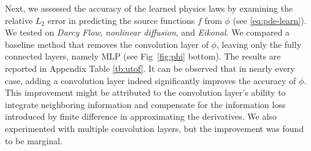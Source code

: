  
Next, we assessed the accuracy of the learned physics laws by examining the relative \(L_2\) error in predicting the source functions \(f\) from \(\phi\) (see \eqref{eq:pde-learn}). We tested on \textit{Darcy Flow}, \textit{nonlinear diffusion}, and \textit{Eikonal}. We compared a baseline method that removes the convolution layer of \(\phi\), leaving only the fully connected layers, namely MLP (see Fig~\ref{fig:phi} bottom). 
The results are reported in Appendix Table \ref{tb:utof}. 
It can be observed that in nearly every case, adding a convolution layer indeed significantly improves the accuracy of \(\phi\). This improvement might be attributed to the convolution layer's ability to integrate neighboring information and compensate for the information loss introduced by finite difference in approximating  the derivatives. We also experimented with multiple convolution layers, but the improvement was found to be marginal. 

